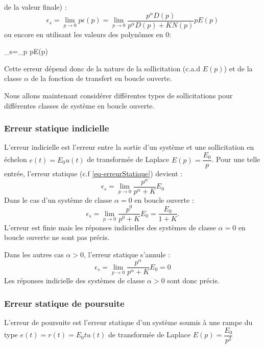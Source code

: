 de la valeur finale) :
\[
\epsilon_s=\lim\limits_{p\to 0} p\epsilon(p)=\lim\limits_{p\to 0} 
           \dfrac{p^\alpha D(p)}{p^\alpha D(p)+KN(p)}pE(p) 
\]
ou encore en utilisant les valeurs des polynômes en 0: 
\begin{bequation}
	\epsilon_s=\lim\limits_{p} pE(p)
	\label{eq-erreurStatique}
\end{bequation}
Cette erreur dépend donc de la nature de la sollicitation (c.a.d $E(p)$) et 
de la classe $\alpha$ de la fonction de transfert en boucle ouverte.

Nous allons maintenant considérer différentes types de sollicitations pour 
différentes classes de système en boucle ouverte.
\subsubsection{Erreur statique indicielle}
L'erreur indicielle est l'erreur entre la sortie d'un système et une 
sollicitation en échelon $e(t)=E_0u(t)$ de transformée de Laplace 
$E(p)=\dfrac{E_0}{p}$. 
Pour une telle entrée, l'erreur statique (c.f \cref{eq-erreurStatique}) 
devient :
\[
\epsilon_s=\lim\limits_{p\to 0} \dfrac{p^\alpha}{p^\alpha+K}E_0
\]
Dans le cas d'un système de classe $\alpha=0$ en boucle ouverte :
\[
\epsilon_s=\lim\limits_{p\to 0} \dfrac{p^0}{p^0+K}E_0=\dfrac{E_0}{1+K}.
\]
L'erreur est finie mais les réponses indicielles des systèmes de classe 
$\alpha=0$ en boucle ouverte ne sont pas précis.

Dans les autres cas $\alpha>0$, l'erreur statique s'annule :
\[
\epsilon_s=\lim\limits_{p\to 0} \dfrac{p^\alpha}{p^\alpha+K}E_0=0
\]
Les réponses indicielle des systèmes de classe $\alpha>0$ sont donc précis.
\subsubsection{Erreur statique de poursuite}
L'erreur de poursuite est l'erreur statique d'un système soumis à une rampe 
du type $e(t)=r(t)=E_0t u(t)$
de transformée de Laplace $E(p)=\dfrac{E_0}{p^2}$

